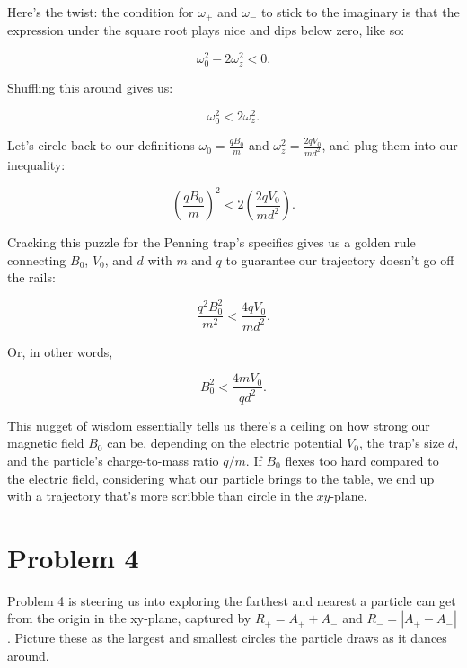 \documentclass{article}
\begin{document}
Here’s the twist: the condition for \(\omega_+\) and \(\omega_-\) to stick to the imaginary is that the expression under the square root plays nice and dips below zero, like so:

\begin{equation}
\omega_0^2 - 2\omega_z^2 < 0.
\end{equation}

Shuffling this around gives us:

\begin{equation}
\omega_0^2 < 2\omega_z^2.
\end{equation}

Let's circle back to our definitions \(\omega_0 = \frac{qB_0}{m}\) and \(\omega_z^2 = \frac{2qV_0}{md^2}\), and plug them into our inequality:

\begin{equation}
\left(\frac{qB_0}{m}\right)^2 < 2\left(\frac{2qV_0}{md^2}\right).
\end{equation}

Cracking this puzzle for the Penning trap’s specifics gives us a golden rule connecting \(B_0\), \(V_0\), and \(d\) with \(m\) and \(q\) to guarantee our trajectory doesn't go off the rails:

\begin{equation}
\frac{q^2B_0^2}{m^2} < \frac{4qV_0}{md^2}.
\end{equation}

Or, in other words,

\begin{equation}
B_0^2 < \frac{4mV_0}{qd^2}.
\end{equation}

This nugget of wisdom essentially tells us there's a ceiling on how strong our magnetic field \(B_0\) can be, depending on the electric potential \(V_0\), the trap's size \(d\), and the particle's charge-to-mass ratio \(q/m\). If \(B_0\) flexes too hard compared to the electric field, considering what our particle brings to the table, we end up with a trajectory that’s more scribble than circle in the \(xy\)-plane.

\section{Problem 4}

Problem 4 is steering us into exploring the farthest and nearest a particle can get from the origin in the xy-plane, captured by \(R_+ = A_+ + A_-\) and \(R_- = |A_+ - A_-|\). Picture these as the largest and smallest circles the particle draws as it dances around.
\end{document}
